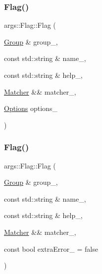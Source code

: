 \subsubsection{\texorpdfstring{Flag()}{Flag()}\hspace{0.1cm}{\footnotesize\ttfamily [1/2]}}
{\footnotesize\ttfamily args\+::\+Flag\+::\+Flag (\begin{DoxyParamCaption}\item[{\hyperlink{classargs_1_1_group}{Group} \&}]{group\+\_\+,  }\item[{const std\+::string \&}]{name\+\_\+,  }\item[{const std\+::string \&}]{help\+\_\+,  }\item[{\hyperlink{classargs_1_1_matcher}{Matcher} \&\&}]{matcher\+\_\+,  }\item[{\hyperlink{namespaceargs_aa530c0f95194aa275f49a5f299ac9e77}{Options}}]{options\+\_\+ }\end{DoxyParamCaption})\hspace{0.3cm}{\ttfamily [inline]}}

\mbox{\label{classargs_1_1_flag_a42deec08baee60827d9576f56f54055c}} 
\subsubsection{\texorpdfstring{Flag()}{Flag()}\hspace{0.1cm}{\footnotesize\ttfamily [2/2]}}
{\footnotesize\ttfamily args\+::\+Flag\+::\+Flag (\begin{DoxyParamCaption}\item[{\hyperlink{classargs_1_1_group}{Group} \&}]{group\+\_\+,  }\item[{const std\+::string \&}]{name\+\_\+,  }\item[{const std\+::string \&}]{help\+\_\+,  }\item[{\hyperlink{classargs_1_1_matcher}{Matcher} \&\&}]{matcher\+\_\+,  }\item[{const bool}]{extra\+Error\+\_\+ = {\ttfamily false} }\end{DoxyParamCaption})\hspace{0.3cm}{\ttfamily [inline]}}

\mbox{\label{classargs_1_1_flag_a726b9a61e5165dd4ae1e2b67241dc761}} 
